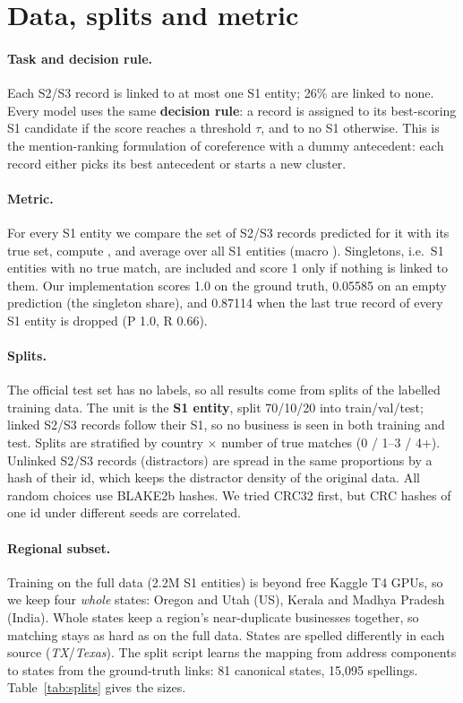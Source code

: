 \section{Data, splits and metric}
\label{sec:data}

\paragraph{Task and decision rule.} Each S2/S3 record is linked to at most one S1 entity; 26\% are linked to
none. Every model uses the same \textbf{decision rule}: a record is assigned to its best-scoring S1 candidate
if the score reaches a threshold $\tau$, and to no S1 otherwise. This is the mention-ranking formulation of
coreference with a dummy antecedent: each record either picks its best antecedent or
starts a new cluster.

\paragraph{Metric.} For every S1 entity we compare the set of S2/S3 records predicted for it with its true
set, compute \fhalf, and average over all S1 entities (macro \fhalf). Singletons, i.e.\ S1 entities with no
true match, are included and score 1 only if nothing is linked to them. Our implementation scores 1.0 on the
ground truth, 0.05585 on an empty prediction (the singleton share), and 0.87114 when the last true record of
every S1 entity is dropped (P 1.0, R 0.66).

\paragraph{Splits.} The official test set has no labels, so all results come from splits of the labelled
training data. The unit is the \textbf{S1 entity}, split 70/10/20 into train/val/test; linked S2/S3 records
follow their S1, so no business is seen in both training and test. Splits are stratified by country $\times$
number of true matches (0 / 1--3 / 4+). Unlinked S2/S3 records (distractors) are spread in the same
proportions by a hash of their id, which keeps the distractor density of the original data. All random
choices use BLAKE2b hashes. We tried CRC32 first, but CRC hashes of one id under different seeds are
correlated.

\paragraph{Regional subset.} Training on the full data (2.2M S1 entities) is beyond free Kaggle T4 GPUs,
so we keep four \emph{whole} states: Oregon and Utah (US), Kerala and Madhya Pradesh (India). Whole states
keep a region's near-duplicate businesses together, so matching stays as hard as on the full data.
States are spelled differently in each source (\emph{TX}/\emph{Texas}). The split script learns the mapping
from address components to states from the ground-truth links: 81 canonical states, 15,095 spellings.
Table~\ref{tab:splits} gives the sizes.

